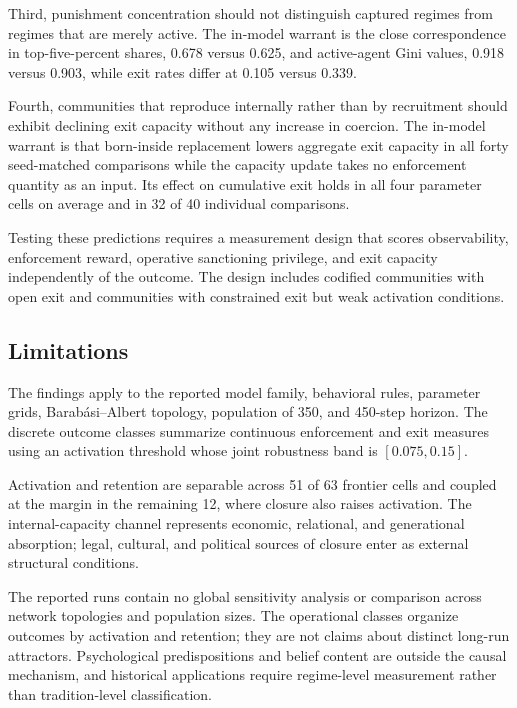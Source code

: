 \documentclass[12pt]{article}
\begin{document}
Third, punishment concentration should not distinguish captured regimes from regimes that are merely active. The in-model warrant is the close correspondence in top-five-percent shares, 0.678 versus 0.625, and active-agent Gini values, 0.918 versus 0.903, while exit rates differ at 0.105 versus 0.339.

Fourth, communities that reproduce internally rather than by recruitment should exhibit declining exit capacity without any increase in coercion. The in-model warrant is that born-inside replacement lowers aggregate exit capacity in all forty seed-matched comparisons while the capacity update takes no enforcement quantity as an input. Its effect on cumulative exit holds in all four parameter cells on average and in 32 of 40 individual comparisons.

Testing these predictions requires a measurement design that scores observability, enforcement reward, operative sanctioning privilege, and exit capacity independently of the outcome. The design includes codified communities with open exit and communities with constrained exit but weak activation conditions.

\subsection{Limitations}

The findings apply to the reported model family, behavioral rules, parameter grids, Barab\'asi--Albert topology, population of 350, and 450-step horizon. The discrete outcome classes summarize continuous enforcement and exit measures using an activation threshold whose joint robustness band is \([0.075,0.15]\).

Activation and retention are separable across 51 of 63 frontier cells and coupled at the margin in the remaining 12, where closure also raises activation. The internal-capacity channel represents economic, relational, and generational absorption; legal, cultural, and political sources of closure enter as external structural conditions.

The reported runs contain no global sensitivity analysis or comparison across network topologies and population sizes. The operational classes organize outcomes by activation and retention; they are not claims about distinct long-run attractors. Psychological predispositions and belief content are outside the causal mechanism, and historical applications require regime-level measurement rather than tradition-level classification.
\end{document}
